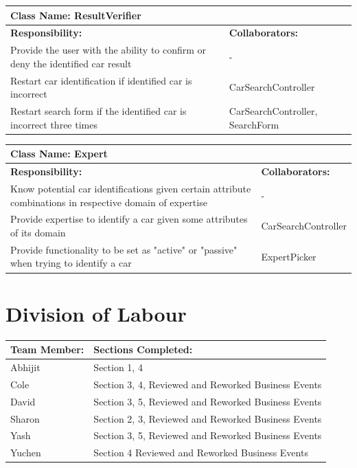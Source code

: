\documentclass[12pt]{article}
\begin{document}
	\begin{table}[ht]
		\centering
		\begin{tabular}{|p{5cm}|p{5cm}|}
			\hline
			\multicolumn{2}{|l|}{\textbf{Class Name:} ResultVerifier} \\
			\hline
			\textbf{Responsibility:} & \textbf{Collaborators:} \\
			\hline
			Provide the user with the ability to confirm or deny the identified car result & -\\
			\hline
			Restart car identification if identified car is incorrect & CarSearchController\\
			\hline
			Restart search form if the identified car is incorrect three times & CarSearchController, SearchForm\\
			\hline
		\end{tabular}
	\end{table}

	\begin{table}[ht]
		\centering
		\begin{tabular}{|p{5cm}|p{5cm}|}
			\hline
			\multicolumn{2}{|l|}{\textbf{Class Name:} Expert} \\
			\hline
			\textbf{Responsibility:} & \textbf{Collaborators:} \\
			\hline
			Know potential car identifications given certain attribute combinations in respective domain of expertise & -\\
			\hline
			Provide expertise to identify a car given some attributes of its domain & CarSearchController\\
			\hline
			Provide functionality to be set as "active" or "passive" when trying to identify a car & ExpertPicker\\
			\hline
		\end{tabular}
	\end{table}

\FloatBarrier
\appendix
\section{Division of Labour}
\label{sec:division_of_labour}
\begin{table}[ht]
	\centering
	\begin{tabular}{|p{5cm}|p{5cm}|}
		\hline
		\textbf{Team Member:} & \textbf{Sections Completed:}\\
		\hline
		Abhijit & Section 1, 4\\
		\hline
		Cole & Section 3, 4, Reviewed and Reworked Business Events\\
		\hline
		David & Section 3, 5, Reviewed and Reworked Business Events\\
		\hline
		Sharon & Section 2, 3, Reviewed and Reworked Business Events\\
		\hline
		Yash & Section 3, 5, Reviewed and Reworked Business Events\\
		\hline
		Yuchen & Section 4 Reviewed and Reworked Business Events\\
		\hline
	\end{tabular}
\end{table}
\end{document}
